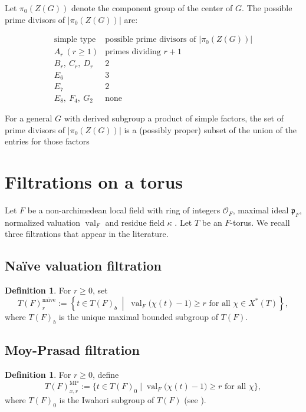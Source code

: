 \documentclass[american]{article}
\numberwithin{equation}{section}
\numberwithin{figure}{section}
\theoremstyle{plain}
\theoremstyle{definition}
\newtheorem{definition}[theorem]{Definition}
\theoremstyle{remark}
\newcommand{\scrO}{\mathscr{O}}
\newcommand{\fracp}{\mathfrak{p}}
\begin{document}
Let $\pi_0(Z(G))$ denote the component group of the center of \(G\). The possible prime divisors of \(|\pi_0(Z(G))|\) are:

\[
\begin{array}{c|l}
\text{simple type} & \text{possible prime divisors of }|\pi_0(Z(G))| \\ \hline
A_r\ (r\ge1) & \text{primes dividing } r+1 \\
B_r,\ C_r,\ D_r & 2 \\
E_6 & 3 \\
E_7 & 2 \\
E_8,\ F_4,\ G_2 & \text{none}
\end{array}
\]

For a general $G$ with derived subgroup a product of simple factors, the set of prime divisors of
$|\pi_0(Z(G))|$ is a (possibly proper) subset of the union of the entries for those factors

\section{Filtrations on a torus}
\label{sec:filtrations}

Let $F$ be a non-archimedean local field with ring of integers $\scrO_{F}$, maximal ideal $\fracp_{F}$,  normalized valuation $\operatorname{val}_{F}$ and residue field \(\kappa\) . Let $T$ be an $F$-torus. We recall three filtrations that appear in the literature.

\subsection{Na\"{i}ve valuation filtration}

\begin{definition} 
For $r\ge0$, set 
\[
T(F)_{r}^{\text{na\"{i}ve}}:=\left\{ t\in T(F)_b\;\middle|\;\operatorname{val}_{F}\bigl(\chi(t)-1\bigr)\ge r\text{ for all }\chi\in X^{\!*}(T)\right\} ,
\]
where $T(F)_b$ is the unique maximal bounded subgroup of $T(F)$.
\end{definition}

\subsection{Moy-Prasad filtration}

\begin{definition} 
For $r\ge0$, define 
\[
T(F)_{x,r}^{\mathrm{MP}}:=\bigl\{ t\in T(F)_{0}\;\big|\;\operatorname{val}_{F}\bigl(\chi(t)-1\bigr)\ge r\text{ for all }\chi\bigr\},
\]
where $T(F)_{0}$ is the Iwahori subgroup of $T(F)$ (see \cite[B.5.1]{KalethaPrasad2016}). 
\end{definition}
\end{document}
